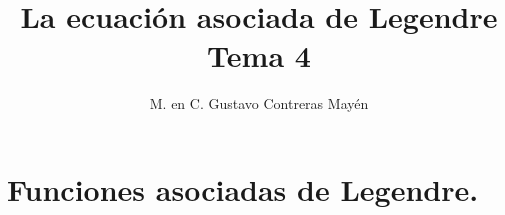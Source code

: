 

\title{La ecuación asociada de Legendre \\ {\large Tema 4}\vspace{-3ex}}
\author{M. en C. Gustavo Contreras Mayén}
\date{ }

\pagestyle{fancy}
\fancyhf{}
\lhead{\leftmark}
\rfoot{\thepage}
\setlength{\headheight}{16pt}%

\def\changemargin#1#2{\list{}{\rightmargin#2\leftmargin#1}\item[]}
\let\endchangemargin=\endlist 



\maketitle
\fontsize{14}{14}\selectfont
\tableofcontents
\newpage


\section{Funciones asociadas de Legendre.}

